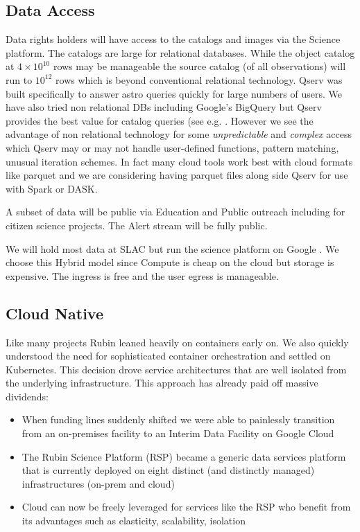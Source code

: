 \documentclass[11pt,twoside]{article}
\begin{document}
\begin{centering}
\end{centering}


\subsection{Data Access} \label{sec:dataaccess}

Data rights holders will have access to the catalogs and images via the Science platform.
The catalogs are large for relational databases.
While the object catalog at $4 \times 10^{10}$ rows may be manageable
the source catalog (of all observations) will run to $ 10^{12}$ rows which is beyond conventional relational technology.
Qserv \citep{C15_adassxxxii} was built specifically to answer astro queries quickly for large numbers of users.
We have also tried non relational DBs including Google's BigQuery but Qserv provides the best value for catalog queries (see e.g. \citet{Document-31100}.
However we see the advantage of non relational technology for
some  \emph{unpredictable} and \emph{complex} access which Qserv may or may not handle user-defined functions, pattern matching, unusual iteration schemes.
In fact many cloud tools work best with cloud formats like parquet and
 we are considering having parquet files along side Qserv for use with Spark or DASK.

A subset of data will be public via Education and Public outreach including for citizen science projects.
The Alert stream will be fully public.

We will hold most data at SLAC but run the science platform on Google \citep{2021arXiv211115030O}.
We choose this Hybrid model since Compute is cheap on the cloud but storage is expensive.
The ingress is free and the user egress is manageable.

\subsection{Cloud Native}\label{sec:cloudnative}
Like many projects \citep{2017ASPC..512...33O} Rubin leaned heavily on containers early on.
We also quickly understood the need for sophisticated container orchestration and settled on Kubernetes.
This decision drove service architectures that are well isolated from the underlying infrastructure.
This approach has already paid off massive dividends:

\begin{itemize}
\item When funding lines suddenly shifted we were able to painlessly transition from an on-premises facility to an Interim Data Facility on Google Cloud
\item The Rubin Science Platform (RSP) became a generic data services platform that is currently deployed on eight distinct (and distinctly managed) infrastructures (on-prem and cloud)
\item Cloud can now be freely leveraged for services like the RSP who benefit from its advantages such as elasticity, scalability, isolation
\end{itemize}
\end{document}
